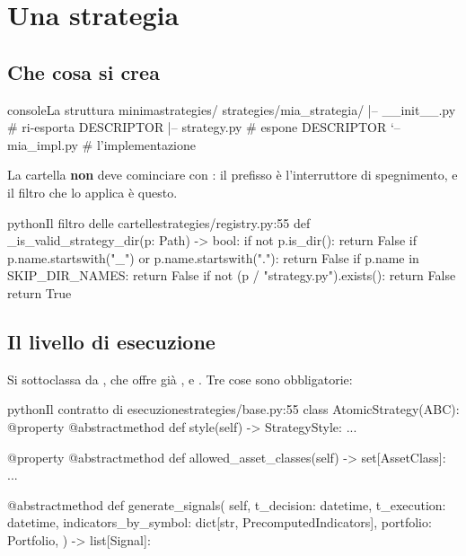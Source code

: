 \section{Una strategia}\label{sez:nuova-strategia}

\subsection{Che cosa si crea}

\begin{codiceInterno}{console}{La struttura minima}{strategies/}
strategies/mia_strategia/
|-- __init__.py       # ri-esporta DESCRIPTOR
|-- strategy.py       # espone DESCRIPTOR
`-- mia_impl.py       # l'implementazione
\end{codiceInterno}

\noindent
La cartella \textbf{non} deve cominciare con \cod{\_}: il prefisso è
l'interruttore di spegnimento, e il filtro che lo applica è questo.

\begin{codiceInterno}{python}{Il filtro delle cartelle}{strategies/registry.py:55}
def _is_valid_strategy_dir(p: Path) -> bool:
    if not p.is_dir():                                   return False
    if p.name.startswith("_") or p.name.startswith("."): return False
    if p.name in SKIP_DIR_NAMES:                         return False
    if not (p / "strategy.py").exists():                 return False
    return True
\end{codiceInterno}

\subsection{Il livello di esecuzione}

Si sottoclassa  da , che
offre già ,  e
. Tre cose sono obbligatorie:

\begin{codiceInterno}{python}{Il contratto di esecuzione}{strategies/base.py:55}
class AtomicStrategy(ABC):
    @property
    @abstractmethod
    def style(self) -> StrategyStyle: ...

    @property
    @abstractmethod
    def allowed_asset_classes(self) -> set[AssetClass]: ...

    @abstractmethod
    def generate_signals(
        self,
        t_decision: datetime,
        t_execution: datetime,
        indicators_by_symbol: dict[str, PrecomputedIndicators],
        portfolio: Portfolio,
    ) -> list[Signal]:
\end{codiceInterno}

